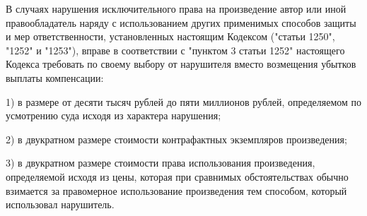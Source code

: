 В случаях нарушения исключительного права на произведение автор или иной правообладатель наряду с использованием других применимых способов защиты и мер ответственности, установленных настоящим Кодексом ("статьи 1250", "1252" и "1253"), вправе в соответствии с "пунктом 3 статьи 1252" настоящего Кодекса требовать по своему выбору от нарушителя вместо возмещения убытков выплаты компенсации:
 
1) в размере от десяти тысяч рублей до пяти миллионов рублей, определяемом по усмотрению суда исходя из характера нарушения;
  
2) в двукратном размере стоимости контрафактных экземпляров произведения;
   
3) в двукратном размере стоимости права использования произведения, определяемой исходя из цены, которая при сравнимых обстоятельствах обычно взимается за правомерное использование произведения тем способом, который использовал нарушитель.
